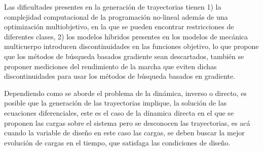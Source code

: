 Las dificultades presentes en la generaci\'on de trayectorias tienen 1) la complejidad computacional de la programaci\'on no-lineal adem\'as de una optimizaci\'on multiobjetivo, en la que se pueden encontrar restricciones de diferentes clases\cite{Mahmoodabadi2014}, 2) los modelos h\'ibridos presentes en los modelos de mec\'anica multicuerpo introducen discontinuidades en las funciones objetivo, lo que propone que los m\'etodos de b\'usqueda basados gradiente sean descartados\cite{Xiang2010}, tambi\'en se proponer mediciones del rendimiento de la marcha que eviten dichas discontinuidades para usar los m\'etodos de b\'usqueda basados en gradiente\cite{Xiang2010}.\par
Dependiendo como se aborde el problema de la din\'amica, inverso o directo, es posible que la generaci\'on de las trayectorias implique, la soluci\'on de las ecuaciones diferenciales, este es el caso de la d\'inamica directa en el que se proponen las cargas sobre el sistema pero se desconocen las trayectorias, es ac\'a cuando la variable de dise\~no en este caso las cargas, se deben buscar la mejor evoluci\'on de cargas en el tiempo, que satisfaga las condiciones de dise\~no.\par

